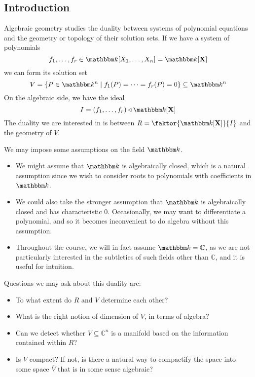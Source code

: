 \subsection{Introduction}
Algebraic geometry studies the duality between systems of polynomial equations and the geometry or topology of their solution sets.
If we have a system of polynomials
\[ f_1, \dots, f_r \in \mathbbm k[X_1, \dots, X_n] = \mathbbm k[\vb X] \]
we can form its solution set
\[ V = \qty{P \in \mathbbm k^n \mid f_1(P) = \dots = f_r(P) = 0} \subseteq \mathbbm k^n \]
On the algebraic side, we have the ideal
\[ I = (f_1, \dots, f_r) \triangleleft \mathbbm k[\vb X] \]
The duality we are interested in is between \( R = \faktor{\mathbbm k[\vb X]}{I} \) and the geometry of \( V \).

We may impose some assumptions on the field \( \mathbbm k \).
\begin{itemize}
    \item We might assume that \( \mathbbm k \) is algebraically closed, which is a natural assumption since we wish to consider roots to polynomials with coefficients in \( \mathbbm k \).
    \item We could also take the stronger assumption that \( \mathbbm k \) is algebraically closed and has characteristic 0.
    Occasionally, we may want to differentiate a polynomial, and so it becomes inconvenient to do algebra without this assumption.
    \item Throughout the course, we will in fact assume \( \mathbbm k = \mathbb C \), as we are not particularly interested in the subtleties of such fields other than \( \mathbb C \), and it is useful for intuition.
\end{itemize}
Questions we may ask about this duality are:
\begin{itemize}
    \item To what extent do \( R \) and \( V \) determine each other?
    \item What is the right notion of dimension of \( V \), in terms of algebra?
    \item Can we detect whether \( V \subseteq \mathbb C^n \) is a manifold based on the information contained within \( R \)?
    \item Is \( V \) compact?
    If not, is there a natural way to compactify the space into some space \( \overline V \) that is in some sense algebraic?
\end{itemize}

